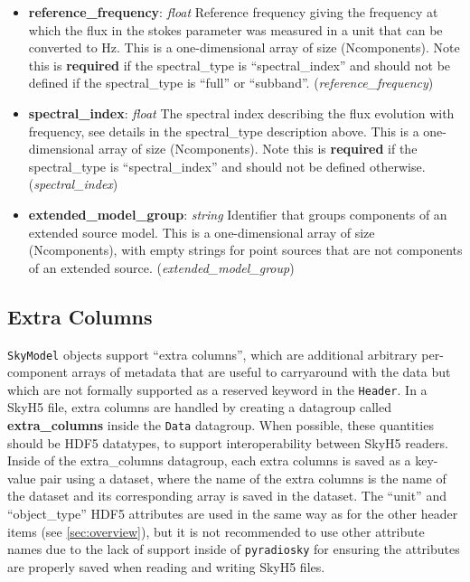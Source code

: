 \documentclass[11pt, oneside]{article}
\begin{document}
\begin{itemize}
\item \textbf{reference\_frequency}: \textit{float}
Reference frequency giving the frequency at which the flux in the stokes
parameter was measured in a unit that can be converted to Hz. This is a
one-dimensional array of size (Ncomponents). Note this is \textbf{required} if
the spectral\_type is ``spectral\_index'' and should not be defined if the
spectral\_type is ``full'' or ``subband''.
(\textit{reference\_frequency})

\item \textbf{spectral\_index}: \textit{float}
The spectral index describing the flux evolution with frequency, see details
in the spectral\_type description above. This is a one-dimensional array
of size (Ncomponents). Note this is \textbf{required} if the spectral\_type is
``spectral\_index'' and should not be defined otherwise.
(\textit{spectral\_index})

\item \textbf{extended\_model\_group}: \textit{string}
Identifier that groups components of an extended source model.
This is a one-dimensional array of size (Ncomponents), with empty strings
for point sources that are not components of an extended source.
(\textit{extended\_model\_group})
\end{itemize}

\subsection{Extra Columns}
\label{sec:extra-columns}
\texttt{SkyModel} objects support ``extra columns'', which are additional arbitrary
per-component arrays of metadata that are useful to carryaround with the data but
which are not formally supported as a reserved keyword in the \texttt{Header}. In a
SkyH5 file, extra columns are handled by creating a datagroup called
\textbf{extra\_columns} inside the \texttt{Data} datagroup. When possible, these
quantities should be HDF5 datatypes, to support interoperability between SkyH5
readers. Inside of the extra\_columns datagroup, each extra columns is saved as
a key-value pair using a dataset, where the name of the extra columns is the name
of the dataset and its corresponding array is saved in the dataset. The ``unit'' and
``object\_type'' HDF5 attributes are used in the same way as for the other header
items (see \ref{sec:overview}), but it is not recommended to use other attribute
names due to the lack of support inside of \texttt{pyradiosky} for ensuring the
attributes are properly saved when reading and writing SkyH5 files.
\end{document}
